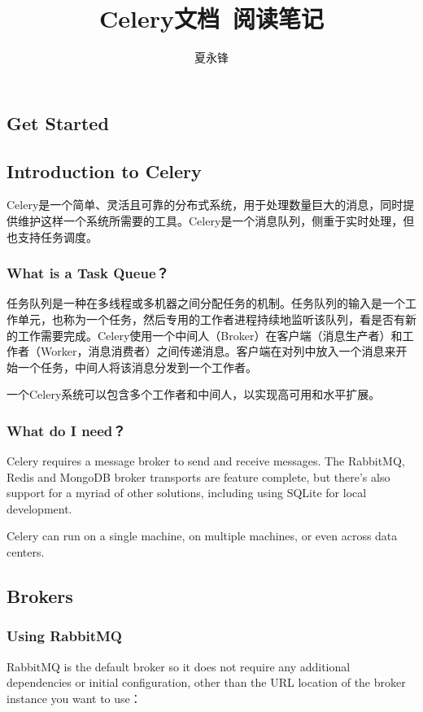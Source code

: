 \documentclass[9pt,a4paper]{article}
\begin{document}
\begin{CJK*}{GBK}{kai}

\title{Celery文档\ 阅读笔记}
\author{夏永锋}

\maketitle

\tableofcontents


\section{Get Started}

\subsection{Introduction to Celery}
Celery是一个简单、灵活且可靠的分布式系统，用于处理数量巨大的消息，同时提供维护这样一个系统所需要的工具。Celery是一个消息队列，侧重于实时处理，但也支持任务调度。

\subsubsection{What is a Task Queue？}
任务队列是一种在多线程或多机器之间分配任务的机制。任务队列的输入是一个工作单元，也称为一个任务，然后专用的工作者进程持续地监听该队列，看是否有新的工作需要完成。Celery使用一个中间人（Broker）在客户端（消息生产者）和工作者（Worker，消息消费者）之间传递消息。客户端在对列中放入一个消息来开始一个任务，中间人将该消息分发到一个工作者。

一个Celery系统可以包含多个工作者和中间人，以实现高可用和水平扩展。

\subsubsection{What do I need？}
Celery requires a message broker to send and receive messages. The RabbitMQ, Redis and MongoDB broker transports are feature complete, but there\textquoteright s also support for a myriad of other solutions, including using SQLite for local development.

Celery can run on a single machine, on multiple machines, or even across data centers.

\subsection{Brokers}

\subsubsection{Using RabbitMQ}
RabbitMQ is the default broker so it does not require any additional dependencies or initial configuration, other than the URL location of the broker instance you want to use：


\end{CJK*}
\end{document}
